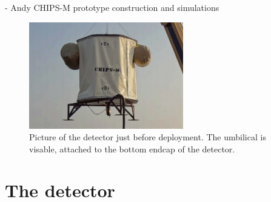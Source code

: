 - Andy CHIPS-M prototype construction and simulations~\cite{perch2015}

\begin{figure} %
    \includegraphics[width=0.6\textwidth]{diagrams/5-chips/chips_m.png}
    \caption[Picture of the \chipsm detector.]
    {Picture of the \chipsm detector just before deployment. The umbilical is visable, attached to
        the bottom endcap of the detector.}
    \label{fig:chips_m}
\end{figure}

\section{The \chipsfive detector} %
\label{sec:chips_detector} %

